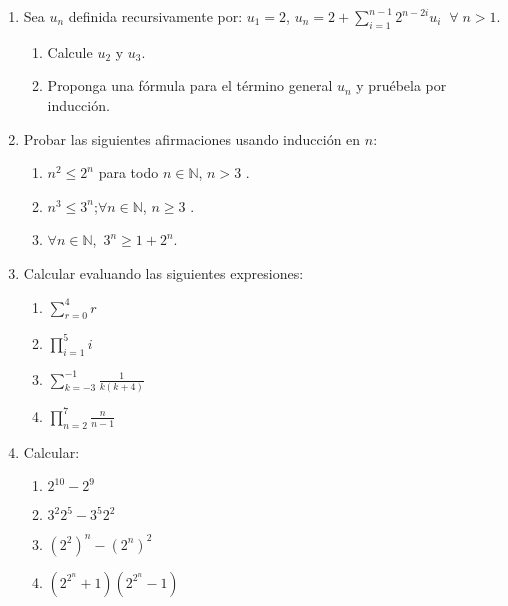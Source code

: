 \documentclass[12pt,spanish,makeidx]{amsbook}
\begin{document}
\begin{enumerate}
\smallskip

\item Sea $u_n$ definida recursivamente por: $u_1=2$, $u_n=2+\sum_{i=1}^{n-1}2^{n-2i}u_i \;\;\forall\; n >1$.
\begin{enumerate}
 \item Calcule $u_2$ y $u_3$.
 \item Proponga una fórmula para el término general $u_n$ y pruébela por inducción.
\end{enumerate}


\smallskip

\item Probar las siguientes afirmaciones usando inducci\'on en $n$:
\begin{enumerate}
\item $n^2\leq 2^n$ para todo $n\in{\mathbb N}$, $n>3$ .
\item $n^3 \le 3^n$;\quad $\forall n \in {\mathbb N}$, $n\ge 3$ .
\item $\forall n \in {\mathbb N}$,\ $3^n \ge 1 + 2^n$.
\end{enumerate}

\smallskip


\item Calcular evaluando las siguientes expresiones:
\begin{multicols}{4}
 \begin{enumerate}
\item \quad $\displaystyle{\sum_{r=0}^4 r}$
\item \quad $\displaystyle{\prod_{i=1}^5 i}$
\item  \quad $\displaystyle{\sum_{k=-3}^{-1} \frac{1}{k(k+4)}}$
\item \quad $\displaystyle{\prod_{n=2}^7 \frac{n}{n-1}}$
\end{enumerate}
\end{multicols}




\smallskip

\item Calcular:
\begin{multicols}{2}
 \begin{enumerate}
\item \quad $2^{10} - 2^{9}$
\item \quad $3^2 2^5 - 3^5 2^2$
\item \quad $(2^2)^n - (2^n)^2$
\item \quad $(2^{2^n} + 1)  (2^{2^n} - 1)$
\end{enumerate}
\end{multicols}





\end{enumerate}
\end{document}
